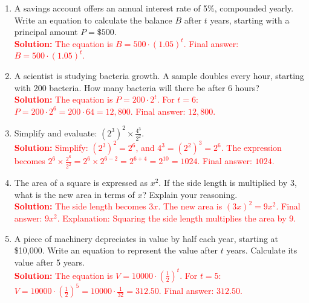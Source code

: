 \documentclass[9pt]{article}
\begin{document}
\vspace{1em}
\begin{tcolorbox}[colframe=black!60, colback=white, 
coltitle=black, colbacktitle=black!15, fonttitle=\bfseries\Large, 
title=Problems, halign title=center, left=10pt, right=10pt, top=10pt, bottom=80pt]
\begin{enumerate}[start=10, itemsep=4em]
    \item A savings account offers an annual interest rate of 5\%, compounded yearly. Write an equation to calculate the balance \(B\) after \(t\) years, starting with a principal amount \(P = \$500\).\\
    \textcolor{red}{\textbf{Solution:} The equation is \(B = 500 \cdot (1.05)^t\). Final answer: \(B = 500 \cdot (1.05)^t\).}

    \item A scientist is studying bacteria growth. A sample doubles every hour, starting with 200 bacteria. How many bacteria will there be after 6 hours?\\
    \textcolor{red}{\textbf{Solution:} The equation is \(P = 200 \cdot 2^t\). For \(t = 6\): \(P = 200 \cdot 2^6 = 200 \cdot 64 = 12,800\). Final answer: \(12,800\).}

    \item Simplify and evaluate: \( (2^3)^2 \times \frac{4^3}{2^2} \).\\
    \textcolor{red}{\textbf{Solution:} Simplify: \((2^3)^2 = 2^6\), and \(4^3 = (2^2)^3 = 2^6\). The expression becomes \(2^6 \times \frac{2^6}{2^2} = 2^6 \times 2^{6-2} = 2^{6+4} = 2^{10} = 1024\). Final answer: \(1024\).}

    \item The area of a square is expressed as \(x^2\). If the side length is multiplied by \(3\), what is the new area in terms of \(x\)? Explain your reasoning.\\
    \textcolor{red}{\textbf{Solution:} The side length becomes \(3x\). The new area is \((3x)^2 = 9x^2\). Final answer: \(9x^2\). Explanation: Squaring the side length multiplies the area by 9.}

    \item A piece of machinery depreciates in value by half each year, starting at \$10,000. Write an equation to represent the value after \(t\) years. Calculate its value after 5 years.\\
    \textcolor{red}{\textbf{Solution:} The equation is \(V = 10000 \cdot \left(\frac{1}{2}\right)^t\). For \(t = 5\): \(V = 10000 \cdot \left(\frac{1}{2}\right)^5 = 10000 \cdot \frac{1}{32} = 312.50\). Final answer: \(312.50\).}


\end{enumerate}
\end{tcolorbox}
\end{document}
